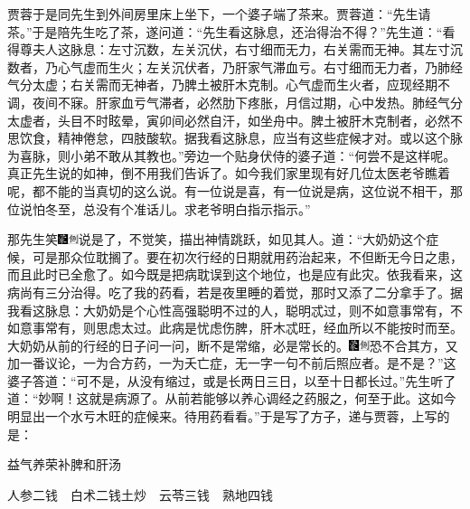 贾蓉于是同先生到外间房里床上坐下，一个婆子端了茶来。贾蓉道：“先生请茶。”于是陪先生吃了茶，遂问道：“先生看这脉息，还治得治不得？”先生道：“看得尊夫人这脉息：左寸沉数，左关沉伏，右寸细而无力，右关需而无神。其左寸沉数者，乃心气虚而生火；左关沉伏者，乃肝家气滞血亏。右寸细而无力者，乃肺经气分太虚；右关需而无神者，乃脾土被肝木克制。心气虚而生火者，应现经期不调，夜间不寐。肝家血亏气滞者，必然肋下疼胀，月信过期，心中发热。肺经气分太虚者，头目不时眩晕，寅卯间必然自汗，如坐舟中。脾土被肝木克制者，必然不思饮食，精神倦怠，四肢酸软。据我看这脉息，应当有这些症候才对。或以这个脉为喜脉，则小弟不敢从其教也。”旁边一个贴身伏侍的婆子道：“何尝不是这样呢。真正先生说的如神，倒不用我们告诉了。如今我们家里现有好几位太医老爷瞧着呢，都不能的当真切的这么说。有一位说是喜，有一位说是病，这位说不相干，那位说怕冬至，总没有个准话儿。求老爷明白指示指示。”

那先生笑{\includegraphics[width=3mm]{../Images/00006}\includegraphics[width=3mm]{../Images/00011}\footnotesize \kaishu 说是了，不觉笑，描出神情跳跃，如见其人。}道：“大奶奶这个症候，可是那众位耽搁了。要在初次行经的日期就用药治起来，不但断无今日之患，而且此时已全愈了。如今既是把病耽误到这个地位，也是应有此灾。依我看来，这病尚有三分治得。吃了我的药看，若是夜里睡的着觉，那时又添了二分拿手了。据我看这脉息：大奶奶是个心性高强聪明不过的人，聪明忒过，则不如意事常有，不如意事常有，则思虑太过。此病是忧虑伤脾，肝木忒旺，经血所以不能按时而至。大奶奶从前的行经的日子问一问，断不是常缩，必是常长的。{\includegraphics[width=3mm]{../Images/00006}\includegraphics[width=3mm]{../Images/00011}\footnotesize \kaishu 恐不合其方，又加一番议论，一为合方药，一为夭亡症，无一字一句不前后照应者。}是不是？”这婆子答道：“可不是，从没有缩过，或是长两日三日，以至十日都长过。”先生听了道：“妙啊！这就是病源了。从前若能够以养心调经之药服之，何至于此。这如今明显出一个水亏木旺的症候来。待用药看看。”于是写了方子，递与贾蓉，上写的是：

\hspace{2em}益气养荣补脾和肝汤

\hspace{2em}人参{\small 二钱}　白术{\small 二钱土炒}　云苓{\small 三钱}　熟地{\small 四钱}

